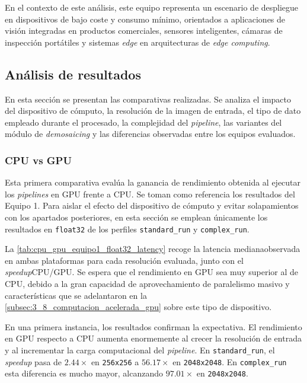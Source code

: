 En el contexto de este análisis, este equipo representa un escenario de despliegue
en dispositivos de bajo coste y consumo mínimo, orientados a aplicaciones de visión
integradas en productos comerciales, sensores inteligentes, cámaras de inspección
portátiles y sistemas \textit{edge} en arquitecturas de \textit{edge computing}.

\newpage

\subsection{Análisis de resultados} \label{subsec:9_benchmarking_analysis}

En esta sección se presentan las comparativas realizadas. 
Se analiza el impacto del dispositivo de cómputo, 
la resolución de la imagen de entrada, el tipo de dato empleado durante el 
procesado, la complejidad del \textit{pipeline}, las variantes del módulo de 
\textit{demosaicing} y las diferencias observadas entre los equipos evaluados.

\subsubsection{CPU vs GPU} \label{subsubsec:cpu_gpu_comparison}

Esta primera comparativa evalúa la ganancia de rendimiento obtenida al ejecutar los
\textit{pipelines} en GPU frente a CPU. Se toman como referencia los resultados del Equipo 1.
Para aislar el efecto del dispositivo de cómputo y evitar solapamientos con los apartados
posteriores, en esta sección se emplean únicamente los resultados en \texttt{float32} de los perfiles
\texttt{standard\_run} y \texttt{complex\_run}.

La \autoref{tab:cpu_gpu_equipo1_float32_latency} recoge la latencia mediana\footnotemark[4]
observada en ambas plataformas para cada resolución evaluada, junto con el \textit{speedup}\footnotemark[5]
CPU/GPU. Se espera que el rendimiento en GPU sea muy superior al de CPU, debido a la gran capacidad de aprovechamiento
de paralelismo masivo y características que se adelantaron en la \autoref{subsec:3_8_computacion_acelerada_gpu}
sobre este tipo de dispositivo.



En una primera instancia, los resultados confirman la expectativa. El rendimiento en GPU
respecto a CPU aumenta enormemente al crecer la resolución de entrada y al incrementar 
la carga computacional del \textit{pipeline}.
En \texttt{standard\_run}, el \textit{speedup} pasa de \(2.44\times\) en
\texttt{256x256} a \(56.17\times\) en \texttt{2048x2048}. En
\texttt{complex\_run} esta diferencia es mucho mayor, alcanzando
\(97.01\times\) en \texttt{2048x2048}.


